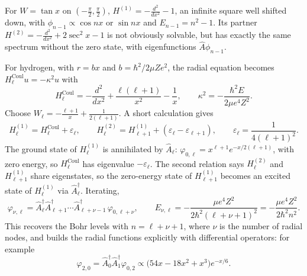 \begin{example}
For $W = \tan x$ on $(-\frac\pi2,\frac\pi2)$, $H^{(1)} = -\frac{d^2}{dx^2} - 1$, an infinite square well shifted down, with $\phi_{n-1}\propto\cos nx$ or $\sin nx$ and $E_{n-1} = n^2-1$. Its partner $H^{(2)} = -\frac{d^2}{dx^2} + 2\sec^2x - 1$ is not obviously solvable, but has exactly the same spectrum without the zero state, with eigenfunctions $\hat{A}\phi_{n-1}$.
\end{example}

For hydrogen, with $r = bx$ and $b = \hbar^2/2\mu Ze^2$, the radial equation becomes $H_\ell^{\text{Coul}}u = -\kappa^2u$ with
\[
    H_\ell^{\text{Coul}} = -\frac{d^2}{dx^2} + \frac{\ell(\ell+1)}{x^2} - \frac1x,
    \qquad
    \kappa^2 = -\frac{\hbar^2E}{2\mu e^4Z^2}.
\]
Choose $W_\ell = -\frac{\ell+1}{x} + \frac{1}{2(\ell+1)}$. A short calculation gives
\[
    H_\ell^{(1)} = H_\ell^{\text{Coul}} + \varepsilon_\ell,
    \qquad
    H_\ell^{(2)} = H_{\ell+1}^{(1)} + (\varepsilon_\ell - \varepsilon_{\ell+1}),
    \qquad
    \varepsilon_\ell = \frac{1}{4(\ell+1)^2}.
\]
The ground state of $H_\ell^{(1)}$ is annihilated by $\hat{A}_\ell$: $\varphi_{0,\ell} = x^{\ell+1}e^{-x/2(\ell+1)}$, with zero energy, so $H_\ell^{\text{Coul}}$ has eigenvalue $-\varepsilon_\ell$. The second relation says $H_\ell^{(2)}$ and $H_{\ell+1}^{(1)}$ share eigenstates, so the zero-energy state of $H_{\ell+1}^{(1)}$ becomes an excited state of $H_\ell^{(1)}$ via $\hat{A}_\ell^\dagger$. Iterating,
\[
    \varphi_{\nu,\ell} = \hat{A}_\ell^\dagger\hat{A}_{\ell+1}^\dagger\cdots\hat{A}_{\ell+\nu-1}^\dagger\,\varphi_{0,\ell+\nu},
    \qquad
    E_{\nu,\ell} = -\frac{\mu e^4Z^2}{2\hbar^2(\ell+\nu+1)^2} = -\frac{\mu e^4Z^2}{2\hbar^2n^2}.
\]
This recovers the Bohr levels with $n = \ell+\nu+1$, where $\nu$ is the number of radial nodes, and builds the radial functions explicitly with differential operators: for example
\[
    \varphi_{2,0} = \hat{A}_0^\dagger\hat{A}_1^\dagger\varphi_{0,2}\propto\bigl(54x - 18x^2 + x^3\bigr)e^{-x/6}.
\]

